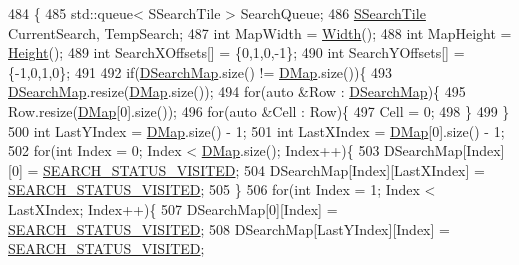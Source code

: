 \begin{DoxyCode}
484                                                                                               \{
485     std::queue< SSearchTile > SearchQueue;
486     \hyperlink{structSSearchTile}{SSearchTile} CurrentSearch, TempSearch;
487     \textcolor{keywordtype}{int} MapWidth = \hyperlink{classCTerrainMap_a34cb754aa9b26e85a73377159f2527d7}{Width}();
488     \textcolor{keywordtype}{int} MapHeight = \hyperlink{classCTerrainMap_ae5e4bf6507e0e3e9ac0322b43eed8a7a}{Height}();
489     \textcolor{keywordtype}{int} SearchXOffsets[] = \{0,1,0,-1\};
490     \textcolor{keywordtype}{int} SearchYOffsets[] = \{-1,0,1,0\};
491     
492     \textcolor{keywordflow}{if}(\hyperlink{classCAssetDecoratedMap_a7e6c8b62a9f83cec4bc77dc833d5787a}{DSearchMap}.size() != \hyperlink{classCTerrainMap_a80d154ce478948b10473534a7bca13f6}{DMap}.size())\{
493         \hyperlink{classCAssetDecoratedMap_a7e6c8b62a9f83cec4bc77dc833d5787a}{DSearchMap}.resize(\hyperlink{classCTerrainMap_a80d154ce478948b10473534a7bca13f6}{DMap}.size());
494         \textcolor{keywordflow}{for}(\textcolor{keyword}{auto} &Row : \hyperlink{classCAssetDecoratedMap_a7e6c8b62a9f83cec4bc77dc833d5787a}{DSearchMap})\{
495             Row.resize(\hyperlink{classCTerrainMap_a80d154ce478948b10473534a7bca13f6}{DMap}[0].size());
496             \textcolor{keywordflow}{for}(\textcolor{keyword}{auto} &Cell : Row)\{
497                 Cell = 0;
498             \}
499         \}
500         \textcolor{keywordtype}{int} LastYIndex = \hyperlink{classCTerrainMap_a80d154ce478948b10473534a7bca13f6}{DMap}.size() - 1;
501         \textcolor{keywordtype}{int} LastXIndex = \hyperlink{classCTerrainMap_a80d154ce478948b10473534a7bca13f6}{DMap}[0].size() - 1;
502         \textcolor{keywordflow}{for}(\textcolor{keywordtype}{int} Index = 0; Index < \hyperlink{classCTerrainMap_a80d154ce478948b10473534a7bca13f6}{DMap}.size(); Index++)\{
503             DSearchMap[Index][0] = \hyperlink{AssetDecoratedMap_8cpp_ae8b1ae5dd44be7811fb48e54c1194503}{SEARCH\_STATUS\_VISITED};
504             DSearchMap[Index][LastXIndex] = \hyperlink{AssetDecoratedMap_8cpp_ae8b1ae5dd44be7811fb48e54c1194503}{SEARCH\_STATUS\_VISITED}; 
505         \}
506         \textcolor{keywordflow}{for}(\textcolor{keywordtype}{int} Index = 1; Index < LastXIndex; Index++)\{
507             DSearchMap[0][Index] = \hyperlink{AssetDecoratedMap_8cpp_ae8b1ae5dd44be7811fb48e54c1194503}{SEARCH\_STATUS\_VISITED};
508             DSearchMap[LastYIndex][Index] = \hyperlink{AssetDecoratedMap_8cpp_ae8b1ae5dd44be7811fb48e54c1194503}{SEARCH\_STATUS\_VISITED};

\end{DoxyCode}
